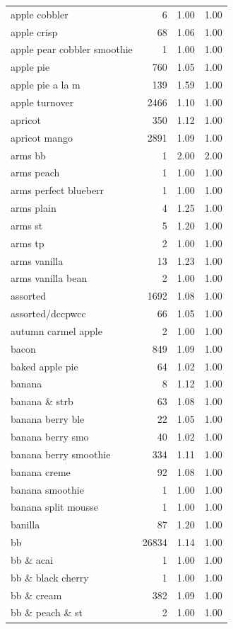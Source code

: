 \begin{table}
\begin{tabular}{lrrr}
apple cobbler & 6 & 1.00 & 1.00 \\
apple crisp & 68 & 1.06 & 1.00 \\
apple pear cobbler smoothie & 1 & 1.00 & 1.00 \\
apple pie & 760 & 1.05 & 1.00 \\
apple pie a la m & 139 & 1.59 & 1.00 \\
apple turnover & 2466 & 1.10 & 1.00 \\
apricot & 350 & 1.12 & 1.00 \\
apricot mango & 2891 & 1.09 & 1.00 \\
arms bb & 1 & 2.00 & 2.00 \\
arms peach & 1 & 1.00 & 1.00 \\
arms perfect blueberr & 1 & 1.00 & 1.00 \\
arms plain & 4 & 1.25 & 1.00 \\
arms st & 5 & 1.20 & 1.00 \\
arms tp & 2 & 1.00 & 1.00 \\
arms vanilla & 13 & 1.23 & 1.00 \\
arms vanilla bean & 2 & 1.00 & 1.00 \\
assorted & 1692 & 1.08 & 1.00 \\
assorted/dccpwcc & 66 & 1.05 & 1.00 \\
autumn carmel apple & 2 & 1.00 & 1.00 \\
bacon & 849 & 1.09 & 1.00 \\
baked apple pie & 64 & 1.02 & 1.00 \\
banana & 8 & 1.12 & 1.00 \\
banana \& strb & 63 & 1.08 & 1.00 \\
banana berry ble & 22 & 1.05 & 1.00 \\
banana berry smo & 40 & 1.02 & 1.00 \\
banana berry smoothie & 334 & 1.11 & 1.00 \\
banana creme & 92 & 1.08 & 1.00 \\
banana smoothie & 1 & 1.00 & 1.00 \\
banana split mousse & 1 & 1.00 & 1.00 \\
banilla & 87 & 1.20 & 1.00 \\
bb & 26834 & 1.14 & 1.00 \\
bb \& acai & 1 & 1.00 & 1.00 \\
bb \& black cherry & 1 & 1.00 & 1.00 \\
bb \& cream & 382 & 1.09 & 1.00 \\
bb \& peach \& st & 2 & 1.00 & 1.00 \\

\end{tabular}
\end{table}
